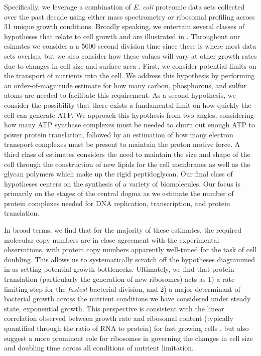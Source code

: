 Specifically, we leverage a combination of \textit{E. coli} proteomic data sets
collected over the past decade using either mass spectrometry
\citep{schmidt2016,peebo2015, valgepea2013} or ribosomal profiling
\citep{li2014} across 31 unique growth conditions. Broadly speaking, we
entertain several classes of hypotheses that relate to cell growth and are
illustrated in .  Throughout our esimates we consider a a 5000
second division time since these is where most data sets overlap, but we also
consider how these values will vary at other growth rates due to changes in cell
size and surface area \citep{taheriaraghi2015}. First, we consider potential
limits on the transport of nutrients into the cell. We address this hypothesis
by performing an order-of-magnitude estimate for how many carbon, phosphorous,
and sulfur atoms are needed to facilitate this requirement. As a second
hypothesis, we consider the possibility that there exists a fundamental limit on
how quickly the cell can generate ATP. We approach this hypothesis from two
angles, considering how many ATP synthase complexes must be needed to churn out
enough ATP to power protein translation, followed by an estimation of how many
electron transport complexes must be present to maintain the proton motive
force. A third class of estimates considers the need to maintain the size and
shape of the cell through the construction of new lipids for the cell membranes
as well as the glycan polymers which make up the rigid peptidoglycan. Our final
class of hypotheses centers on the synthesis of a variety of biomolecules. Our
focus is primarily on the stages of the central dogma as we estimate the number
of protein complexes needed for DNA replication, transcription, and protein
translation.

In broad terms, we find that for the majority of these estimates, the required molecular copy
numbers are in close
agreement with the experimental observations, with protein copy numbers
apparently well-tuned for the task of cell doubling. This allows us to
systematically scratch off the hypotheses diagrammed in  as
setting potential growth bottlenecks. Ultimately, we find that protein
translation (particularly the generation of new ribosomes) acts as 1) a rate
limiting step for the \textit{fastest} bacterial division, and 2) a major
determinant of bacterial growth across the nutrient conditions we have
considered under steady state, exponential growth. This perspective is
consistent with the linear correlation observed between growth rate and
ribosomal content (typically quantified through the ratio of RNA to protein) for
fast growing cells \citep{scott2010}, but also suggest a more prominent role for
ribosomes in governing the changes in cell size and doubling time across all
conditions of nutrient limitation.

